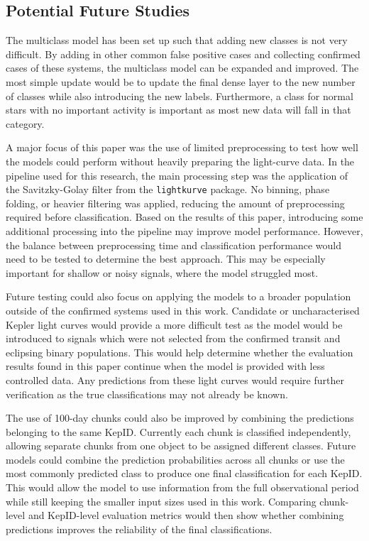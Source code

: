 \subsection{Potential Future Studies}

The multiclass model has been set up such that adding new classes is not very difficult. By adding in other common false positive cases and collecting confirmed cases of these systems, the multiclass model can be expanded and improved. The most simple update would be to update the final dense layer to the new number of classes while also introducing the new labels. Furthermore, a class for normal stars with no important activity is important as most new data will fall in that category.

A major focus of this paper was the use of limited preprocessing to test how well the models could perform without heavily preparing the light-curve data. In the pipeline used for this research, the main processing step was the application of the Savitzky-Golay filter from the \texttt{lightkurve} package. No binning, phase folding, or heavier filtering was applied, reducing the amount of preprocessing required before classification. Based on the results of this paper, introducing some additional processing into the pipeline may improve model performance. However, the balance between preprocessing time and classification performance would need to be tested to determine the best approach. This may be especially important for shallow or noisy signals, where the model struggled most.

Future testing could also focus on applying the models to a broader population outside of the confirmed systems used in this work. Candidate or uncharacterised Kepler light curves would provide a more difficult test as the model would be introduced to signals which were not selected from the confirmed transit and eclipsing binary populations. This would help determine whether the evaluation results found in this paper continue when the model is provided with less controlled data. Any predictions from these light curves would require further verification as the true classifications may not already be known.

The use of 100-day chunks could also be improved by combining the predictions belonging to the same KepID. Currently each chunk is classified independently, allowing separate chunks from one object to be assigned different classes. Future models could combine the prediction probabilities across all chunks or use the most commonly predicted class to produce one final classification for each KepID. This would allow the model to use information from the full observational period while still keeping the smaller input sizes used in this work. Comparing chunk-level and KepID-level evaluation metrics would then show whether combining predictions improves the reliability of the final classifications.

